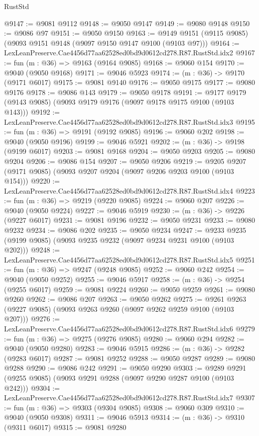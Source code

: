 \begin{lexlean}{RustStd}
\begin{coremodule}
{{@9147 := @9081 @9112
@9148 := @9050 @9147
@9149 := @9080 @9148
@9150 := @9086 @97
@9151 := @9050 @9150
@9163 := @9149 @9151 (@9115 @9085) (@9093 @9151 @9148 (@9097 @9150 @9147 @9100 (@9103 @97)))
@9164 := LexLeanPreserve.Cae4456d77aa62528ed0bd9d0612cd278.R87.RustStd.idx2
@9167 := fun (m : @36) => @9163 (@9164 @9085)
@9168 := @9060 @154
@9170 := @9040 (@9050 @9168)
@9171 := @9046 @5923
@9174 := (m : @36) -> @9170 (@9171 @6017)
@9175 := @9081 @9140
@9176 := @9050 @9175
@9177 := @9080 @9176
@9178 := @9086 @143
@9179 := @9050 @9178
@9191 := @9177 @9179 (@9143 @9085) (@9093 @9179 @9176 (@9097 @9178 @9175 @9100 (@9103 @143)))
@9192 := LexLeanPreserve.Cae4456d77aa62528ed0bd9d0612cd278.R87.RustStd.idx3
@9195 := fun (m : @36) => @9191 (@9192 @9085)
@9196 := @9060 @202
@9198 := @9040 (@9050 @9196)
@9199 := @9046 @5921
@9202 := (m : @36) -> @9198 (@9199 @6017)
@9203 := @9081 @9168
@9204 := @9050 @9203
@9205 := @9080 @9204
@9206 := @9086 @154
@9207 := @9050 @9206
@9219 := @9205 @9207 (@9171 @9085) (@9093 @9207 @9204 (@9097 @9206 @9203 @9100 (@9103 @154)))
@9220 := LexLeanPreserve.Cae4456d77aa62528ed0bd9d0612cd278.R87.RustStd.idx4
@9223 := fun (m : @36) => @9219 (@9220 @9085)
@9224 := @9060 @207
@9226 := @9040 (@9050 @9224)
@9227 := @9046 @5919
@9230 := (m : @36) -> @9226 (@9227 @6017)
@9231 := @9081 @9196
@9232 := @9050 @9231
@9233 := @9080 @9232
@9234 := @9086 @202
@9235 := @9050 @9234
@9247 := @9233 @9235 (@9199 @9085) (@9093 @9235 @9232 (@9097 @9234 @9231 @9100 (@9103 @202)))
@9248 := LexLeanPreserve.Cae4456d77aa62528ed0bd9d0612cd278.R87.RustStd.idx5
@9251 := fun (m : @36) => @9247 (@9248 @9085)
@9252 := @9060 @242
@9254 := @9040 (@9050 @9252)
@9255 := @9046 @5917
@9258 := (m : @36) -> @9254 (@9255 @6017)
@9259 := @9081 @9224
@9260 := @9050 @9259
@9261 := @9080 @9260
@9262 := @9086 @207
@9263 := @9050 @9262
@9275 := @9261 @9263 (@9227 @9085) (@9093 @9263 @9260 (@9097 @9262 @9259 @9100 (@9103 @207)))
@9276 := LexLeanPreserve.Cae4456d77aa62528ed0bd9d0612cd278.R87.RustStd.idx6
@9279 := fun (m : @36) => @9275 (@9276 @9085)
@9280 := @9060 @294
@9282 := @9040 (@9050 @9280)
@9283 := @9046 @5915
@9286 := (m : @36) -> @9282 (@9283 @6017)
@9287 := @9081 @9252
@9288 := @9050 @9287
@9289 := @9080 @9288
@9290 := @9086 @242
@9291 := @9050 @9290
@9303 := @9289 @9291 (@9255 @9085) (@9093 @9291 @9288 (@9097 @9290 @9287 @9100 (@9103 @242)))
@9304 := LexLeanPreserve.Cae4456d77aa62528ed0bd9d0612cd278.R87.RustStd.idx7
@9307 := fun (m : @36) => @9303 (@9304 @9085)
@9308 := @9060 @309
@9310 := @9040 (@9050 @9308)
@9311 := @9046 @5913
@9314 := (m : @36) -> @9310 (@9311 @6017)
@9315 := @9081 @9280
}}
\end{coremodule}
\end{lexlean}
